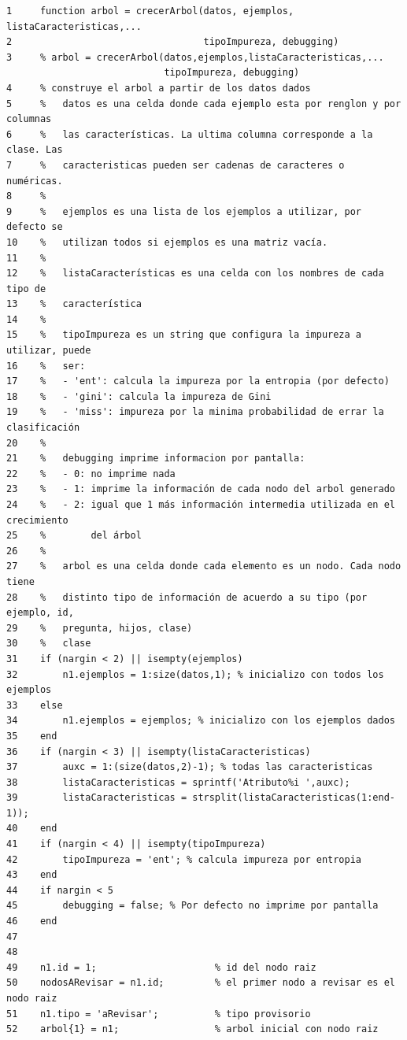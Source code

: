 \documentclass[11pt,a4paper,final]{article}
\begin{document}
\begin{verbatim}
1     function arbol = crecerArbol(datos, ejemplos, listaCaracteristicas,...
2                                  tipoImpureza, debugging)
3     % arbol = crecerArbol(datos,ejemplos,listaCaracteristicas,...
                            tipoImpureza, debugging)
4     % construye el arbol a partir de los datos dados
5     %   datos es una celda donde cada ejemplo esta por renglon y por columnas
6     %   las características. La ultima columna corresponde a la clase. Las
7     %   caracteristicas pueden ser cadenas de caracteres o numéricas.
8     %   
9     %   ejemplos es una lista de los ejemplos a utilizar, por defecto se
10    %   utilizan todos si ejemplos es una matriz vacía.
11    %   
12    %   listaCaracterísticas es una celda con los nombres de cada tipo de
13    %   característica
14    %
15    %   tipoImpureza es un string que configura la impureza a utilizar, puede
16    %   ser:
17    %   - 'ent': calcula la impureza por la entropia (por defecto)
18    %   - 'gini': calcula la impureza de Gini
19    %   - 'miss': impureza por la minima probabilidad de errar la clasificación
20    %
21    %   debugging imprime informacion por pantalla:
22    %   - 0: no imprime nada
23    %   - 1: imprime la información de cada nodo del arbol generado
24    %   - 2: igual que 1 más información intermedia utilizada en el crecimiento
25    %        del árbol
26    %
27    %   arbol es una celda donde cada elemento es un nodo. Cada nodo tiene
28    %   distinto tipo de información de acuerdo a su tipo (por ejemplo, id,
29    %   pregunta, hijos, clase)
30    %   clase 
31    if (nargin < 2) || isempty(ejemplos)
32        n1.ejemplos = 1:size(datos,1); % inicializo con todos los ejemplos
33    else
34        n1.ejemplos = ejemplos; % inicializo con los ejemplos dados
35    end
36    if (nargin < 3) || isempty(listaCaracteristicas)
37        auxc = 1:(size(datos,2)-1); % todas las caracteristicas
38        listaCaracteristicas = sprintf('Atributo%i ',auxc);
39        listaCaracteristicas = strsplit(listaCaracteristicas(1:end-1));
40    end
41    if (nargin < 4) || isempty(tipoImpureza)
42        tipoImpureza = 'ent'; % calcula impureza por entropia
43    end
44    if nargin < 5
45        debugging = false; % Por defecto no imprime por pantalla
46    end
47    
48    
49    n1.id = 1;                     % id del nodo raiz
50    nodosARevisar = n1.id;         % el primer nodo a revisar es el nodo raiz
51    n1.tipo = 'aRevisar';          % tipo provisorio
52    arbol{1} = n1;                 % arbol inicial con nodo raiz

\end{verbatim}
\end{document}
